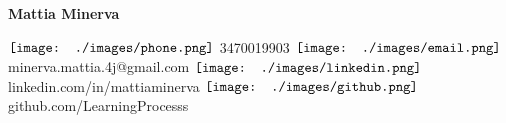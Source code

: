 \documentclass[10pt]{article}
\begin{document}
\author{}

\begin{flushleft}
	\LARGE\bfseries{Mattia Minerva}
\end{flushleft}


\vspace{-1em}


\begin{flushleft}
	$\vcenter{\hbox{\texttt{[image: ./images/phone.png]}}}$ \footnotesize{3470019903}
	\hspace{2em}
	$\vcenter{\hbox{\texttt{[image: ./images/email.png]}}}$ \footnotesize{minerva.mattia.4j@gmail.com}
	\hspace{2em}
	$\vcenter{\hbox{\texttt{[image: ./images/linkedin.png]}}}$ \footnotesize{linkedin.com/in/mattiaminerva}
	\hspace{2em}
	$\vcenter{\hbox{\texttt{[image: ./images/github.png]}}}$ \footnotesize{github.com/LearningProcesss}
\end{flushleft}

\vspace{-1.7em}
\end{document}
